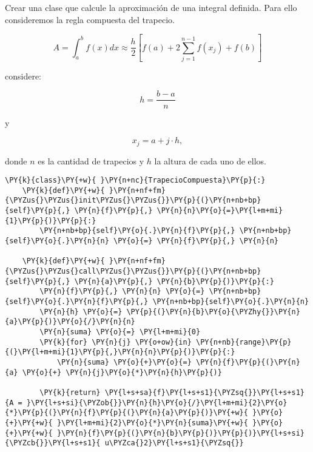 \begin{example}
Crear una clase que calcule la aproximación de una integral definida.
Para ello consideremos la regla compuesta del trapecio.

\[ A = \int_a^b f(x)dx \approx \frac{h}{2}\left[f(a) + 2\sum_{j=1}^{n-1}f(x_j) + f(b) \right] \]

considere:

\[ h = \dfrac{b-a}{n} \]

y

\[ x_j = a + j\cdot h, \]

donde \(n\) es la cantidad de trapecios y \(h\) la altura de cada uno de
ellos.

\begin{tcolorbox}[breakable, size=fbox, boxrule=1pt, pad at break*=1mm,colback=cellbackground, colframe=cellborder]
\begin{Verbatim}[commandchars=\\\{\}]
\PY{k}{class}\PY{+w}{ }\PY{n+nc}{TrapecioCompuesta}\PY{p}{:}
    \PY{k}{def}\PY{+w}{ }\PY{n+nf+fm}{\PYZus{}\PYZus{}init\PYZus{}\PYZus{}}\PY{p}{(}\PY{n+nb+bp}{self}\PY{p}{,} \PY{n}{f}\PY{p}{,} \PY{n}{n}\PY{o}{=}\PY{l+m+mi}{1}\PY{p}{)}\PY{p}{:}
        \PY{n+nb+bp}{self}\PY{o}{.}\PY{n}{f}\PY{p}{,} \PY{n+nb+bp}{self}\PY{o}{.}\PY{n}{n} \PY{o}{=} \PY{n}{f}\PY{p}{,} \PY{n}{n}
    
    \PY{k}{def}\PY{+w}{ }\PY{n+nf+fm}{\PYZus{}\PYZus{}call\PYZus{}\PYZus{}}\PY{p}{(}\PY{n+nb+bp}{self}\PY{p}{,} \PY{n}{a}\PY{p}{,} \PY{n}{b}\PY{p}{)}\PY{p}{:}
        \PY{n}{f}\PY{p}{,} \PY{n}{n} \PY{o}{=} \PY{n+nb+bp}{self}\PY{o}{.}\PY{n}{f}\PY{p}{,} \PY{n+nb+bp}{self}\PY{o}{.}\PY{n}{n}
        \PY{n}{h} \PY{o}{=} \PY{p}{(}\PY{n}{b}\PY{o}{\PYZhy{}}\PY{n}{a}\PY{p}{)}\PY{o}{/}\PY{n}{n}
        \PY{n}{suma} \PY{o}{=} \PY{l+m+mi}{0}
        \PY{k}{for} \PY{n}{j} \PY{o+ow}{in} \PY{n+nb}{range}\PY{p}{(}\PY{l+m+mi}{1}\PY{p}{,}\PY{n}{n}\PY{p}{)}\PY{p}{:}
            \PY{n}{suma} \PY{o}{+}\PY{o}{=} \PY{n}{f}\PY{p}{(}\PY{n}{a} \PY{o}{+} \PY{n}{j}\PY{o}{*}\PY{n}{h}\PY{p}{)}

        \PY{k}{return} \PY{l+s+sa}{f}\PY{l+s+s1}{\PYZsq{}}\PY{l+s+s1}{A = }\PY{l+s+si}{\PYZob{}}\PY{n}{h}\PY{o}{/}\PY{l+m+mi}{2}\PY{o}{*}\PY{p}{(}\PY{n}{f}\PY{p}{(}\PY{n}{a}\PY{p}{)}\PY{+w}{ }\PY{o}{+}\PY{+w}{ }\PY{l+m+mi}{2}\PY{o}{*}\PY{n}{suma}\PY{+w}{ }\PY{o}{+}\PY{+w}{ }\PY{n}{f}\PY{p}{(}\PY{n}{b}\PY{p}{)}\PY{p}{)}\PY{l+s+si}{\PYZcb{}}\PY{l+s+s1}{ u\PYZca{}2}\PY{l+s+s1}{\PYZsq{}}
\end{Verbatim}
\end{tcolorbox}


\end{example}
